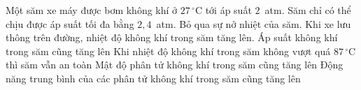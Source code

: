 	\begin{ex}%
		Một săm xe máy được bơm không khí ở $27\,^\circ\text{C}$ tới áp suất $2$~atm. Săm chỉ có thể chịu được áp suất tối đa bằng $2{,}4$~atm. Bỏ qua sự nở nhiệt của săm. Khi xe lưu thông trên đường, nhiệt độ không khí trong săm tăng lên.
		\choiceTFt
		{\True Áp suất không khí trong săm cũng tăng lên}
		{\True Khi nhiệt độ không khí trong săm không vượt quá $87\,^\circ\text{C}$ thì săm vẫn an toàn}
		{Mật độ phân tử không khí trong săm cũng tăng lên}
		{\True Động năng trung bình của các phân tử không khí trong săm cũng tăng lên}
	\end{ex}

